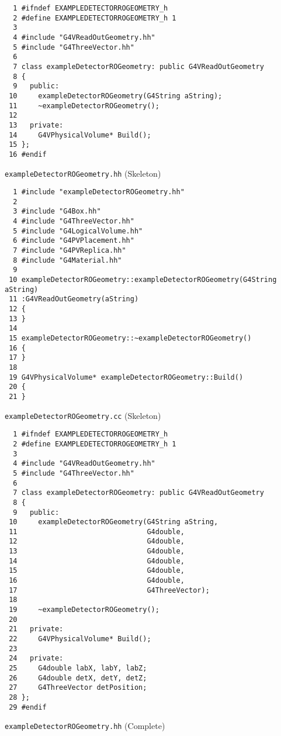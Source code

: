 \begin{code}[p]
\begin{lstlisting}
  1 #ifndef EXAMPLEDETECTORROGEOMETRY_h
  2 #define EXAMPLEDETECTORROGEOMETRY_h 1
  3 
  4 #include "G4VReadOutGeometry.hh"
  5 #include "G4ThreeVector.hh"
  6 
  7 class exampleDetectorROGeometry: public G4VReadOutGeometry
  8 {
  9   public:
 10     exampleDetectorROGeometry(G4String aString);
 11     ~exampleDetectorROGeometry();
 12     
 13   private:
 14     G4VPhysicalVolume* Build();
 15 };  
 16 #endif
\end{lstlisting}
\caption{\texttt{exampleDetectorROGeometry.hh} (Skeleton) \label{code-4-1}}
\end{code}

\begin{code}[p]
\begin{lstlisting}
  1 #include "exampleDetectorROGeometry.hh"
  2 
  3 #include "G4Box.hh"
  4 #include "G4ThreeVector.hh"
  5 #include "G4LogicalVolume.hh"
  6 #include "G4PVPlacement.hh"
  7 #include "G4PVReplica.hh"
  8 #include "G4Material.hh"
  9 
 10 exampleDetectorROGeometry::exampleDetectorROGeometry(G4String aString)
 11 :G4VReadOutGeometry(aString)
 12 {
 13 }
 14 
 15 exampleDetectorROGeometry::~exampleDetectorROGeometry()
 16 {
 17 }
 18 
 19 G4VPhysicalVolume* exampleDetectorROGeometry::Build()
 20 {
 21 } 
\end{lstlisting}
\caption{\texttt{exampleDetectorROGeometry.cc} (Skeleton) \label{code-4-2}}
\end{code}

\begin{code}[p]
\begin{lstlisting}
  1 #ifndef EXAMPLEDETECTORROGEOMETRY_h
  2 #define EXAMPLEDETECTORROGEOMETRY_h 1
  3 
  4 #include "G4VReadOutGeometry.hh"
  5 #include "G4ThreeVector.hh"
  6 
  7 class exampleDetectorROGeometry: public G4VReadOutGeometry
  8 {
  9   public:
 10     exampleDetectorROGeometry(G4String aString,
 11                               G4double,
 12                               G4double,
 13                               G4double,
 14                               G4double,
 15                               G4double,
 16                               G4double,
 17                               G4ThreeVector);
 18 
 19     ~exampleDetectorROGeometry();
 20 
 21   private:
 22     G4VPhysicalVolume* Build();
 23 
 24   private:
 25     G4double labX, labY, labZ;
 26     G4double detX, detY, detZ;
 27     G4ThreeVector detPosition;
 28 };
 29 #endif
\end{lstlisting}
\caption{\texttt{exampleDetectorROGeometry.hh} (Complete) \label{code-4-3}}
\end{code}

